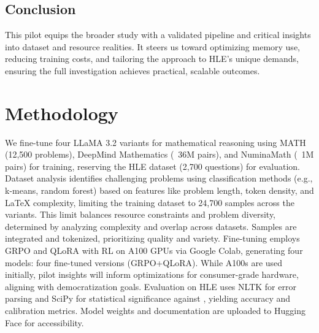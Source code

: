 \documentclass{svproc}
\begin{document}
\subsection{Conclusion}

This pilot equips the broader study with a validated pipeline and critical insights into dataset and resource realities. It steers us toward optimizing memory use, reducing training costs, and tailoring the approach to HLE’s unique demands, ensuring the full investigation achieves practical, scalable outcomes.


\section{Methodology}

We fine-tune four LLaMA 3.2 variants for mathematical reasoning using MATH \cite{hendrycksmath2021} (12,500 problems), DeepMind Mathematics \cite{saxton2019analysingmathematicalreasoningabilities} (~36M pairs), and NuminaMath \cite{numina_math_datasets} (~1M pairs) for training, reserving the HLE dataset \cite{phan2025humanitysexam} (2,700 questions) for evaluation. Dataset analysis identifies challenging problems using classification methods (e.g., k-means, random forest) based on features like problem length, token density, and LaTeX complexity, limiting the training dataset to 24,700 samples across the variants. This limit balances resource constraints and problem diversity, determined by analyzing complexity and overlap across datasets. Samples are integrated and tokenized, prioritizing quality and variety. Fine-tuning employs GRPO \cite{shao2024deepseekmathpushinglimitsmathematical} and QLoRA with RL on A100 GPUs via Google Colab, generating four models:  four fine-tuned versions (GRPO+QLoRA). While A100s are used initially, pilot insights will inform optimizations for consumer-grade hardware, aligning with democratization goals. Evaluation on HLE uses NLTK for error parsing and SciPy for statistical significance against \cite{phan2025humanitysexam}, yielding accuracy and calibration metrics. Model weights and documentation are uploaded to Hugging Face for accessibility.
\end{document}

